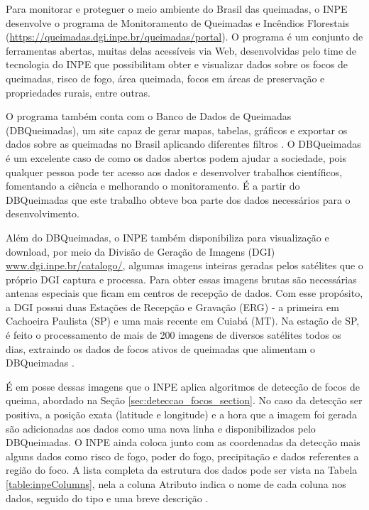 \documentclass[cic,tc]{iiufrgs}
\begin{document}
Para monitorar e proteguer o meio ambiente do Brasil das queimadas, o INPE desenvolve o programa de Monitoramento de Queimadas e Incêndios Florestais (\url{https://queimadas.dgi.inpe.br/queimadas/portal}). O programa é um conjunto de ferramentas abertas, muitas delas acessíveis via Web, desenvolvidas pelo time de tecnologia do INPE que possibilitam obter e visualizar dados sobre os focos de queimadas, risco de fogo, área queimada, focos em áreas de preservação e propriedades rurais, entre outras.

O programa também conta com o Banco de Dados de Queimadas (DBQueimadas), um site capaz de gerar mapas, tabelas, gráficos e exportar os dados sobre as queimadas no Brasil aplicando diferentes filtros \citep{setzer2019banco}. O DBQueimadas é um excelente caso de como os dados abertos podem ajudar a sociedade, pois qualquer pessoa pode ter acesso aos dados e desenvolver trabalhos científicos, fomentando a ciência e melhorando o monitoramento. É a partir do DBQueimadas que este trabalho obteve boa parte dos dados necessários para o desenvolvimento.

Além do DBQueimadas, o INPE também disponibiliza para visualização e download, por meio da Divisão de Geração de Imagens (DGI) \url{www.dgi.inpe.br/catalogo/}, algumas imagens inteiras geradas pelos satélites que o próprio DGI captura e processa. Para obter essas imagens brutas são necessárias antenas especiais que ficam em centros de recepção de dados. Com esse propósito, a DGI possui duas Estações de Recepção e Gravação (ERG) - a primeira em Cachoeira Paulista (SP) e uma mais recente em Cuiabá (MT). Na estação de SP, é feito o processamento de mais de 200 imagens de diversos satélites todos os dias, extraindo os dados de focos ativos de queimadas que alimentam o DBQueimadas \citep{SiteDGI}. \par

É em posse dessas imagens que o INPE aplica algoritmos de detecção de focos de queima, abordado na Seção \ref{sec:deteccao_focos_section}. No caso da detecção ser positiva, a posição exata (latitude e longitude) e a hora que a imagem foi gerada são adicionadas aos dados como uma nova linha e disponibilizados pelo DBQueimadas. O INPE ainda coloca junto com as coordenadas da detecção mais alguns dados como risco de fogo, poder do fogo, precipitação e dados referentes a região do foco. A lista completa da estrutura dos dados pode ser vista na Tabela \ref{table:inpeColumns}, nela a coluna Atributo indica o nome de cada coluna nos dados, seguido do tipo e uma breve descrição \cite{PerguntasFrequentesINPE}. \par
\end{document}
